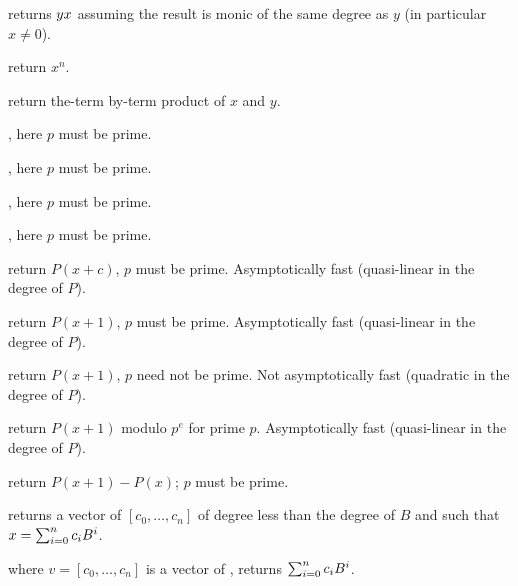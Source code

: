  returns $y\*x$
assuming the result is monic of the same degree as $y$ (in particular $x\neq
0$).



 return $x^n$.


 return the-term by-term product of
$x$ and $y$.

,
here $p$ must be prime.


,
here $p$ must be prime.


,
here $p$ must be prime.



,
here $p$ must be prime.

 return $P(x+c)$, $p$ must be
prime. Asymptotically fast (quasi-linear in the degree of $P$).

 return $P(x+1)$, $p$ must be prime.
Asymptotically fast (quasi-linear in the degree of $P$).

 return $P(x+1)$, $p$
need not be prime. Not asymptotically fast (quadratic in the degree of $P$).

 return $P(x+1)$
modulo $p^e$ for prime $p$. Asymptotically fast (quasi-linear in the degree of
$P$).

 return $P(x+1)-P(x)$; $p$ must be prime.

 returns a vector of 
$[c_0,\ldots,c_n]$ of degree less than the degree of $B$ and such that
$x=\sum_{i=0}^{n}{c_i\*B^i}$.

 where $v=[c_0,\ldots,c_n]$
is a vector of , returns $\sum_{i=0}^{n}{c_i\*B^i}$.

